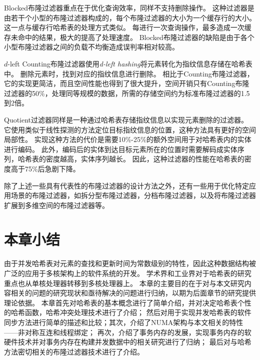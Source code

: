Blocked布隆过滤器\cite{putze2007cache}重点在于优化查询效率，同样不支持删除操作。
这种过滤器是由若干个小型的布隆过滤器构成的，每个布隆过滤器的大小为一个缓存行的大小。
这一点与缓存行哈希表\cite{clht}的处理方式类似。
每进行一次查询操作，最多造成一次缓存未命中的结果，极大的提高了处理速度。
Blocked布隆过滤器的缺陷是由于各个小型布隆过滤器之间的负载不均衡造成误判率相对较高。

$d$-left Counting布隆过滤器\cite{bonomi2006improved}使用\textit{d-left hashing}\cite{mitzenmacher1999asymptotics}将元素转化为指纹信息存储在哈希表中。
删除元素时，找到对应的指纹信息进行删除。
相比于Counting布隆过滤器，它的实现更简洁，而且空间性能也得到了很大提升，空间开销只有Counting布隆过滤器的50\%，处理同等规模的数据，所需的存储空间约为标准布隆过滤器的1.5到2倍。

Quotient过滤器\cite{bender2012don}同样是一种通过哈希表存储指纹信息以实现元素删除的过滤器。
它使用类似于线性探测的方法定位目标指纹信息的位置，这种方法具有更好的空间局部性。
实现这种方法的代价是需要10\%-25\%的额外空间用于对哈希表内的实体进行编码。
此外，编码后的实体到达目标元素所在的位置时需要解码成实体序列，哈希表的密度越高，实体序列越长。
因此，这种过滤器的性能在哈希表的密度高于75\%后急剧下降。

除了上述一些具有代表性的布隆过滤器的设计方法之外，还有一些用于优化特定应用场景的布隆过滤器，如拆分型布隆过滤器\cite{xiaomingzhong2004}，分档布隆过滤器\cite{xiekun2007}，以及将布隆过滤器扩展到多维空间的布隆过滤器\cite{xiekun2008}等。


\section{本章小结}
由于并发哈希表对元素的查找和更新时间为常数级别的特性，因此这种数据结构被广泛的应用于多核架构上的软件系统的开发。
学术界和工业界对于哈希表的研究重点也从单核处理器转移到多核处理器上。
本章的主要目的在于对与本文研究内容相关的问题的研究现状和亟待解决的问题进行归纳，以期为后面章节的研究提供理论依据。
本章首先对哈希表的基本概念进行了简单介绍，并对决定哈希表个性的哈希函数，哈希冲突处理技术进行了介绍；
然后对用于实现并发哈希表的软件同步方法进行简单的描述和比较；其次，介绍了NUMA架构与本文相关的特性——非对称互连和线程绑定；
再次，介绍了事务内存的发展，实现事务内存的软硬件技术并对事务内存在构建并发数据中的相关研究进行了归纳；
最后对与哈希方法密切相关的布隆过滤器技术进行了介绍。


